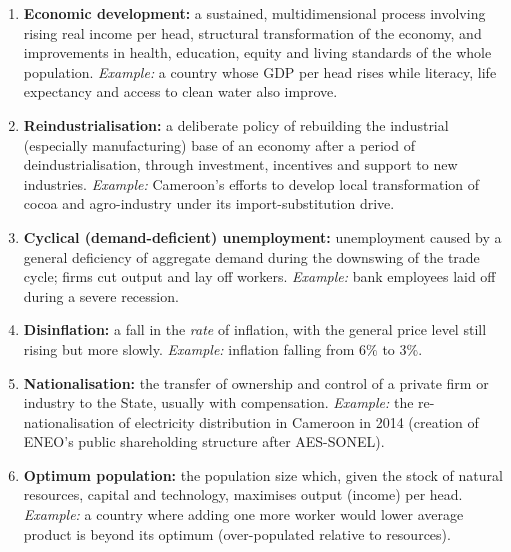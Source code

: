 \documentclass[11pt]{article}
\begin{document}
\begin{corrige}
\begin{enumerate}
\item \textbf{Economic development:} a sustained, multidimensional process involving rising real income per head, structural transformation of the economy, and improvements in health, education, equity and living standards of the whole population. \emph{Example:} a country whose GDP per head rises while literacy, life expectancy and access to clean water also improve.
\item \textbf{Reindustrialisation:} a deliberate policy of rebuilding the industrial (especially manufacturing) base of an economy after a period of deindustrialisation, through investment, incentives and support to new industries. \emph{Example:} Cameroon's efforts to develop local transformation of cocoa and agro-industry under its import-substitution drive.
\item \textbf{Cyclical (demand-deficient) unemployment:} unemployment caused by a general deficiency of aggregate demand during the downswing of the trade cycle; firms cut output and lay off workers. \emph{Example:} bank employees laid off during a severe recession.
\item \textbf{Disinflation:} a fall in the \emph{rate} of inflation, with the general price level still rising but more slowly. \emph{Example:} inflation falling from $6\%$ to $3\%$.
\item \textbf{Nationalisation:} the transfer of ownership and control of a private firm or industry to the State, usually with compensation. \emph{Example:} the re-nationalisation of electricity distribution in Cameroon in 2014 (creation of ENEO's public shareholding structure after AES-SONEL).
\item \textbf{Optimum population:} the population size which, given the stock of natural resources, capital and technology, maximises output (income) per head. \emph{Example:} a country where adding one more worker would lower average product is beyond its optimum (over-populated relative to resources).
\end{enumerate}
\end{corrige}
\end{document}

